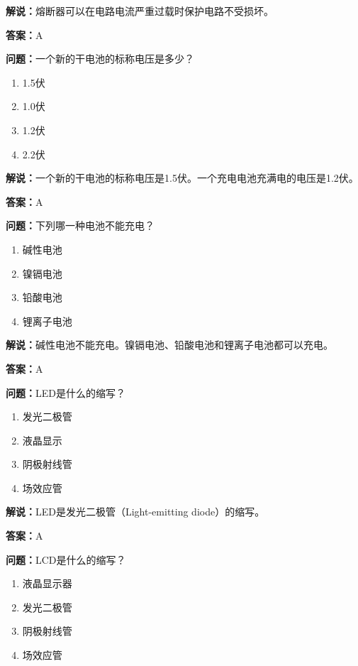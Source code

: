 \textbf{解说：}熔断器可以在电路电流严重过载时保护电路不受损坏。%

\textbf{答案：}A

\textbf{问题：}一个新的干电池的标称电压是多少？

\begin{enumerate}[label=\Alph*), leftmargin=3em]
	\item 1.5伏
	\item 1.0伏
	\item 1.2伏
	\item 2.2伏
\end{enumerate}

\textbf{解说：}一个新的干电池的标称电压是1.5伏。一个充电电池充满电的电压是1.2伏。%

\textbf{答案：}A

\textbf{问题：}下列哪一种电池不能充电？

\begin{enumerate}[label=\Alph*), leftmargin=3em]
	\item 碱性电池
	\item 镍镉电池
	\item 铅酸电池
	\item 锂离子电池
\end{enumerate}

\textbf{解说：}碱性电池不能充电。镍镉电池、铅酸电池和锂离子电池都可以充电。%

\textbf{答案：}A

\textbf{问题：}LED是什么的缩写？

\begin{enumerate}[label=\Alph*), leftmargin=3em]
	\item 发光二极管
	\item 液晶显示
	\item 阴极射线管
	\item 场效应管
\end{enumerate}

\textbf{解说：}LED是发光二极管（Light-emitting diode）的缩写。%

\textbf{答案：}A

\textbf{问题：}LCD是什么的缩写？

\begin{enumerate}[label=\Alph*), leftmargin=3em]
	\item 液晶显示器
	\item 发光二极管
	\item 阴极射线管
	\item 场效应管
\end{enumerate}

